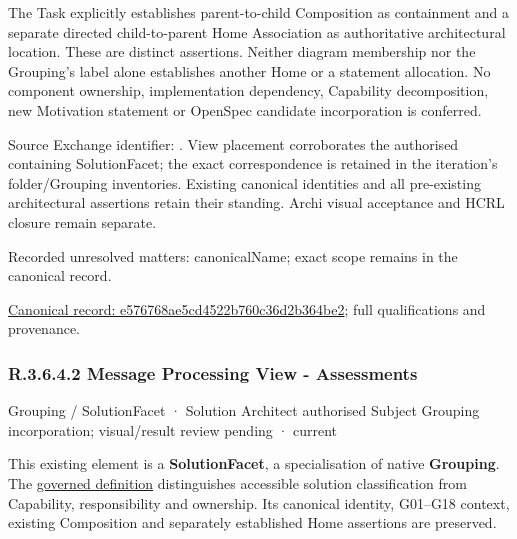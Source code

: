 The Task explicitly establishes parent-to-child Composition as containment and
a separate directed child-to-parent Home Association as authoritative architectural
location. These are distinct assertions. Neither diagram membership nor the
Grouping's label alone establishes another Home or a statement allocation.
No component ownership, implementation dependency, Capability decomposition,
new Motivation statement or OpenSpec candidate incorporation is conferred.



Source Exchange identifier: \texttt{}. View placement corroborates
the authorised containing SolutionFacet; the exact correspondence is retained in the
iteration's folder/Grouping inventories. Existing canonical identities and all
pre-existing architectural assertions retain their standing. Archi visual
acceptance and HCRL closure remain separate.


{\small Recorded unresolved matters: canonicalName; exact scope remains in the canonical record.}\par
{\footnotesize \href{../../../../../../../continuum/grouping/e576768ae5cd4522b760c36d2b364be2.md}{Canonical record: e576768ae5cd4522b760c36d2b364be2}; full qualifications and provenance.}\par
\subsubsection*{R.3.6.4.2 Message Processing View - Assessments}
\label{navigation:R.3.6.4.2}

\label{element:549eaf0604764c01814641872404017f}
{\small Grouping / SolutionFacet · Solution Architect authorised Subject Grouping incorporation; visual/result review pending · current}\par

This existing element is a \textbf{SolutionFacet}, a specialisation of native
\textbf{Grouping}. The \href{\detokenize{../../../../../../../governance/continuum-representation.md#solutionfacet-classification--1119-candidate}}{governed definition}
distinguishes accessible solution classification from Capability, responsibility
and ownership. Its canonical identity, G01–G18 context, existing Composition
and separately established Home assertions are preserved.



